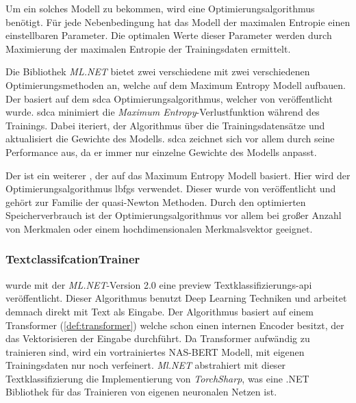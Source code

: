 Um ein solches Modell zu bekommen, wird eine Optimierungsalgorithmus benötigt.
Für jede Nebenbedingung hat das Modell der maximalen Entropie einen einstellbaren Parameter. Die optimalen Werte dieser Parameter werden durch Maximierung der maximalen Entropie der Trainingsdaten ermittelt. \citep[vgl.][]{maximumentorpy1996}

Die Bibliothek \textit{ML.NET} bietet zwei verschiedene  mit zwei verschiedenen Optimierungsmethoden an, welche auf dem Maximum Entropy Modell aufbauen.
Der  basiert auf dem 
\ac{sdca} Optimierungsalgorithmus, welcher von \cite{shalevshwartz2013stochastic} veröffentlicht wurde. \ac{sdca} minimiert die \textit{Maximum Entropy}-Verlustfunktion während des Trainings. Dabei iteriert, der Algorithmus über die Trainingsdatensätze und aktualisiert die Gewichte des Modells. \ac{sdca} zeichnet sich vor allem durch seine Performance aus, da er immer nur einzelne Gewichte des Modells anpasst. \citep[vgl.][]{shalevshwartz2013stochastic,sdcatrainer_doc2022}

Der  ist ein weiterer , der auf das Maximum Entropy Modell basiert. Hier wird der Optimierungsalgorithmus \ac{lbfgs} verwendet. Dieser wurde \citeyear{Liu1989OnTL} von \citeauthor{Liu1989OnTL} veröffentlicht und gehört zur Familie der quasi-Newton Methoden. Durch den optimierten Speicherverbrauch ist der Optimierungsalgorithmus vor allem bei großer Anzahl von Merkmalen oder einem hochdimensionalen Merkmalsvektor geeignet. \citep[vgl.][]{lbfgstrainer_doc2022}

\subsubsection{TextclassifcationTrainer}
\label{c:conception:classification:multiclass:textclassification}
\citeyear{mlnet_textclassification2022} wurde mit der \textit{ML.NET}-Version 2.0 eine preview Textklassifizierungs-\ac{api} veröffentlicht. Dieser Algorithmus benutzt Deep Learning Techniken und arbeitet demnach direkt mit Text als Eingabe. Der Algorithmus basiert auf einem Transformer (\autoref{def:transformer}) welche schon einen internen Encoder besitzt, der das Vektorisieren der Eingabe durchführt. Da Transformer aufwändig zu trainieren sind, wird ein vortrainiertes NAS-BERT Modell, mit eigenen Trainingsdaten nur noch verfeinert. \textit{Ml.NET} abstrahiert mit dieser Textklassifizierung die Implementierung von \textit{TorchSharp}, was eine .NET Bibliothek für das Trainieren von eigenen neuronalen Netzen ist. \citep[vgl.][]{mlnet_textclassification2022}
